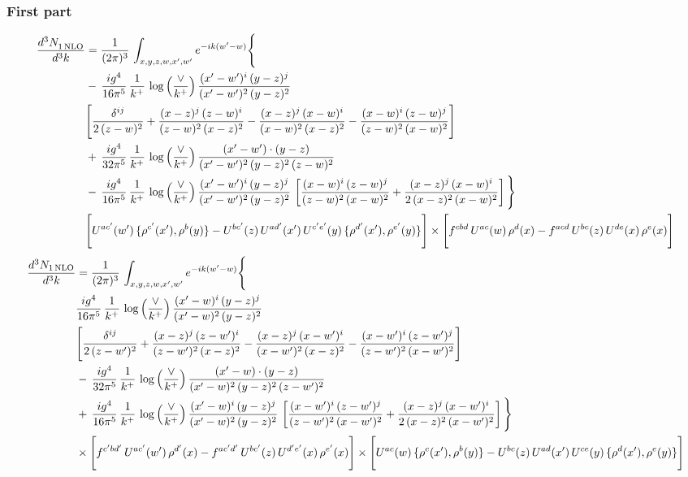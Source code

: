 \documentclass[9pt]{article}
\numberwithin{equation}{section}
\begin{document}
\subsubsection{First part}
\begin{align}
 \frac{d^{3}N_{1\,\rm NLO}^{\rm}}{d^{3}k}  & =     \frac{1}{(2\pi)^{3}}\,\int_{x,y,z,w,x',w^{\prime}} e^{-ik(w^{\prime}-w)}\Bigg\{\notag \\
& -\, \frac{ig^{4}}{16\pi^{5}}\,\frac{1}{k^{+}}\,\log{\left(\frac{\vee}{k^{+}}\right)}\, \frac{(x'-w')^{i}\,(y-z)^{j}}{(x'-w')^{2}\,(y-z)^{2}}\notag \\ &  \Bigg[\frac{\delta^{ij}}{2\,(z-w)^{2}}+\frac{(x-z)^{j}\,(z-w)^{i}}{(z-w)^{2}\,(x-z)^{2}}-\frac{(x-z)^{j}\,(x-w)^{i}}{(x-w)^{2}\,(x-z)^{2}}-\frac{(x-w)^{i}\,(z-w)^{j}}{(z-w)^{2}\,(x-w)^{2}}\Bigg] \notag \\
& +\,\frac{ig^{4}}{32\pi^{5}}\,\frac{1}{k^{+}}\,\log{\left(\frac{\vee}{k^{+}}\right)}\, \frac{(x'-w')\cdot (y-z)}{(x'-w')^{2}\,(y-z)^{2}\,(z-w)^{2}} \notag \\
& -\, \frac{ig^{4}}{16\pi^{5}}\,\frac{1}{k^{+}}\,\log{\left(\frac{\vee}{k^{+}}\right)}\,\frac{(x'-w')^{i}\,(y-z)^{j}}{(x'-w')^{2}\,(y-z)^{2}}\,\left[\frac{(x-w)^{i}\,(z-w)^{j}}{(z-w)^{2}\,(x-w)^{2}}+\frac{(x-z)^{j}\,(x-w)^{i}}{2\,(x-z)^{2}\, (x-w)^{2}}\right]\Bigg\} \notag \\ & \Bigg[U^{ac'}(w')\,\{\rho^{c'}(x'),\rho^{b}(y)\}-U^{bc'}(z)\,U^{ad'}(x')\,U^{c'e'}(y)\, \{\rho^{d'}(x'),\rho^{e'}(y)\}\Bigg]\times \Bigg[f^{cbd}\,U^{ac}(w)\,\rho^{d}(x)-f^{acd}\, U^{bc}(z)\,U^{de}(x)\,\rho^{e}(x)\Bigg]
\end{align}
\begin{align}
\frac{d^{3}N_{1\,\rm NLO}}{d^{3}k} & =  \frac{1}{(2\pi)^{3}}\,\int_{x,y,z,w,x',w^{\prime}} e^{-ik(w^{\prime}-w)}\Bigg\{\notag \\
&  \frac{ig^{4}}{16\pi^{5}}\,\frac{1}{k^{+}}\,\log{\left(\frac{\vee}{k^{+}}\right)}\, \frac{(x'-w)^{i}\,(y-z)^{j}}{(x'-w)^{2}\,(y-z)^{2}}\notag \\ &  \Bigg[\frac{\delta^{ij}}{2\,(z-w')^{2}}+\frac{(x-z)^{j}\,(z-w')^{i}}{(z-w')^{2}\,(x-z)^{2}}-\frac{(x-z)^{j}\,(x-w')^{i}}{(x-w')^{2}\,(x-z)^{2}}-\frac{(x-w')^{i}\,(z-w')^{j}}{(z-w')^{2}\,(x-w')^{2}}\Bigg] \notag \\
& -\,\frac{ig^{4}}{32\pi^{5}}\,\frac{1}{k^{+}}\,\log{\left(\frac{\vee}{k^{+}}\right)}\, \frac{(x'-w)\cdot (y-z)}{(x'-w)^{2}\,(y-z)^{2}\,(z-w')^{2}} \notag \\
& +\,\frac{ig^{4}}{16\pi^{5}}\,\frac{1}{k^{+}}\,\log{\left(\frac{\vee}{k^{+}}\right)}\,\frac{(x'-w)^{i}\,(y-z)^{j}}{(x'-w)^{2}\,(y-z)^{2}}\,\left[\frac{(x-w')^{i}\,(z-w')^{j}}{(z-w')^{2}\,(x-w')^{2}}+\frac{(x-z)^{j}\,(x-w')^{i}}{2\,(x-z)^{2}\, (x-w')^{2}}\right]\Bigg\} \notag \\ & \times\Bigg[f^{c'bd'}\,U^{ac'}(w')\,\rho^{d'}(x)-f^{ac'd'}\, U^{bc'}(z)\,U^{d'e'}(x)\,\rho^{e'}(x)\Bigg] \times \Bigg[U^{ac}(w)\,\{\rho^{c}(x'),\rho^{b}(y)\}-U^{bc}(z)\,U^{ad}(x')\,U^{ce}(y)\, \{\rho^{d}(x'),\rho^{e}(y)\}\Bigg]
    \end{align}
\end{document}
